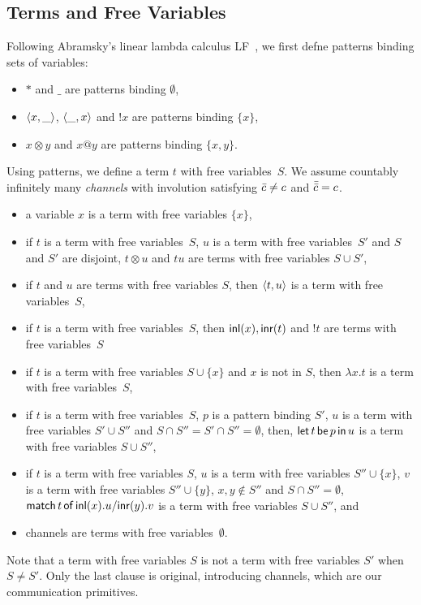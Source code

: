 \subsection{Terms and Free Variables}

Following Abramsky's linear lambda calculus
LF~\citep{abramsky1993computational}, we first defne patterns
binding sets of variables:
\begin{itemize}
 \item $\ast$ and $\_$ are patterns binding $\emptyset$,
 \item $\langle{x,\_}\rangle$, $\langle{\_,x}\rangle$ and $!x$ are patterns binding
       $\{x\}$,
 \item $x\otimes y$ and $x@y$ are patterns binding $\{x,y\}$.
\end{itemize}
Using patterns, we define a term $t$ with free variables~$S$.
We assume countably infinitely many \textit{channels}
with involution
satisfying $\bar{c}\neq c$ and $\bar{\bar{c}} = c$.
\begin{itemize}
 \item a variable $x$ is a term with free variables $\{x\}$,
 \item if $t$ is a term with free variables~$S$, $u$ is a term with
       free variables~$S'$ and $S$ and $S'$ are disjoint, $t\otimes u$ and
       $tu$ are terms with free variables $S\cup S'$,
 \item if $t$ and $u$ are terms with free variables $S$, then
       $\langle{t,u}\rangle$ is a term with free variables~$S$,
 \item if $t$ is a term with free variables~$S$, then
       $\mathsf{inl}({x}), \mathsf{inr}({t})$ and $!t$ are terms with free variables~$S$
 \item if $t$ is a term with free variables $S\cup \{x\}$ and $x$ is not
       in $S$, then $\lambda x.t$ is a term with free variables~$S$,
 \item if $t$ is a term with free variables~$S$, $p$ is a pattern
       binding $S'$, $u$ is a term with free variables $S'\cup S''$ and
       $S\cap S'' = S'\cap S'' = \emptyset$, then,
       $\mathsf{let }\,{t}\,\mathsf{ be }\,{p}\,\mathsf{ in }\,{u}$ is a term with free variables $S\cup S''$,
 \item if $t$ is a term with free variables $S$,
       $u$ is a term with free variables $S''\cup \{x\}$,
       $v$ is a term with free variables $S''\cup \{y\}$,
       $x,y\notin S''$ and $S\cap S'' = \emptyset$,
       $\mathsf{match}\,{t}\,\mathsf{of}\, \mathsf{inl}({x}). {u}/ \mathsf{inr}({y}). {v}$ is a term with free variables $S\cup S''$, and
 \item channels are terms with free variables~$\emptyset$.
\end{itemize}
Note that a term with free variables $S$ is not a term with free
variables $S'$ when $S\neq S'$.  Only the last clause is original,
introducing channels, which are our communication primitives.

